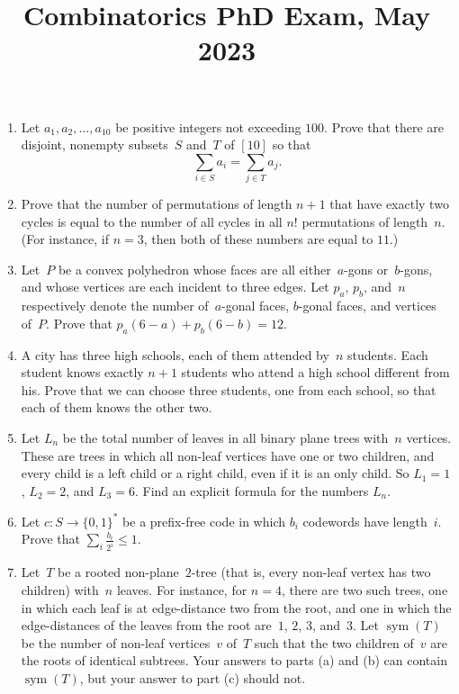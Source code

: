 \documentclass[11pt,letterpaper]{article}
\title{Combinatorics PhD Exam, May 2023}
\author{}
\date{}
\newenvironment{examproblems}[2]{%
  \def\ProblemHeadingTag{#2}%
  \AssignTaggingSocketPlug{block/list/label}{examproblem}%
  \begin{enumerate}%
  \setcounter{enumi}{#1}%
  \renewcommand{\labelenumi}{\textbf{\theenumi.}}%
  \setlength{\topsep}{0.35em}%
  \setlength{\partopsep}{0pt}%
  \setlength{\itemsep}{0.48em}%
  \setlength{\parsep}{0.18em}%
}{\end{enumerate}}
\begin{document}
\maketitle
\thispagestyle{empty}
\begin{examproblems}{0}{H2}
\def\ProblemHeadingText{Problem 1.}
\item
Let \(a_1,a_2,\ldots,a_{10}\) be positive integers not exceeding \(100\). Prove that there are disjoint, nonempty subsets~\(S\) and~\(T\) of \([10]\) so that
\[
\sum_{i\in S}a_i=\sum_{j\in T}a_j.
\]
\def\ProblemHeadingText{Problem 2.}
\item
Prove that the number of permutations of length \(n+1\) that have exactly two cycles is equal to the number of all cycles in all \(n!\) permutations of length~\(n\). (For instance, if \(n=3\), then both of these numbers are equal to \(11\).)
\def\ProblemHeadingText{Problem 3.}
\item
Let~\(P\) be a convex polyhedron whose faces are all either~\(a\)-gons or~\(b\)-gons, and whose vertices are each incident to three edges. Let \(p_a\), \(p_b\), and~\(n\) respectively denote the number of~\(a\)-gonal faces, \(b\)-gonal faces, and vertices of~\(P\). Prove that \(p_a(6-a)+p_b(6-b)=12\).
\def\ProblemHeadingText{Problem 4.}
\item
A city has three high schools, each of them attended by~\(n\) students. Each student knows exactly \(n+1\) students who attend a high school different from his. Prove that we can choose three students, one from each school, so that each of them knows the other two.
\def\ProblemHeadingText{Problem 5.}
\item
Let \(L_n\) be the total number of leaves in all binary plane trees with~\(n\) vertices. These are trees in which all non-leaf vertices have one or two children, and every child is a left child or a right child, even if it is an only child. So \(L_1=1\), \(L_2=2\), and \(L_3=6\). Find an explicit formula for the numbers \(L_n\).
\def\ProblemHeadingText{Problem 6.}
\item
Let \(c:S\to\{0,1\}^*\) be a prefix-free code in which \(b_i\) codewords have length~\(i\). Prove that \(\sum_i \frac{b_i}{2^i}\leq 1\).
\def\ProblemHeadingText{Problem 7.}
\item
Let~\(T\) be a rooted non-plane~\(2\)-tree (that is, every non-leaf vertex has two children) with~\(n\) leaves. For instance, for \(n=4\), there are two such trees, one in which each leaf is at edge-distance two from the root, and one in which the edge-distances of the leaves from the root are~\(1\), \(2\), \(3\), and~\(3\). Let \(\operatorname{sym}(T)\) be the number of non-leaf vertices~\(v\) of~\(T\) such that the two children of~\(v\) are the roots of identical subtrees. Your answers to parts (a) and (b) can contain \(\operatorname{sym}(T)\), but your answer to part (c) should not.

\end{examproblems}
\end{document}
